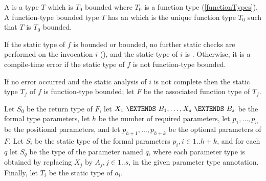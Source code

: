 \documentclass[makeidx]{article}
\begin{document}
{\LMHash{}%
A
is a type $T$ which is $T_0$ bounded where $T_0$ is a function type
(\ref{functionTypes}).
A function-type bounded type $T$ has an
which is the unique function type $T_0$ such that $T$ is $T_0$ bounded.

\LMHash{}%
If the static type of $f$ is \DYNAMIC{} bounded or \FUNCTION{} bounded,
no further static checks are performed on the invocation $i$
(),
and the static type of $i$ is \DYNAMIC{}.
Otherwise, it is a compile-time error if the static type of $f$ is not
function-type bounded.

\LMHash{}%
If no error occurred and the static analysis of $i$ is not complete
then the static type $T_f$ of $f$ is function-type bounded;
let $F$ be the associated function type of $T_f$.

\LMHash{}%
Let $S_0$ be the return type of $F$,
let $X_1\ \EXTENDS\ B_1, \ldots, X_s\ \EXTENDS\ B_s$
be the formal type parameters,
let $h$ be the number of required parameters,
let $p_1, \ldots, p_n$ be the positional parameters,
and let $p_{h+1}, \ldots, p_{h+k}$ be the optional parameters of $F$.
Let $S_i$ be the static type of the formal parameters $p_i, i \in 1 .. h+k$,
and for each $q$ let $S_q$ be the type of the parameter named $q$,
where each parameter type is obtained by replacing $X_j$ by $A_j, j \in 1 .. s$,
in the given parameter type annotation.
Finally, let $T_i$ be the static type of $a_i$.


}
\end{document}

